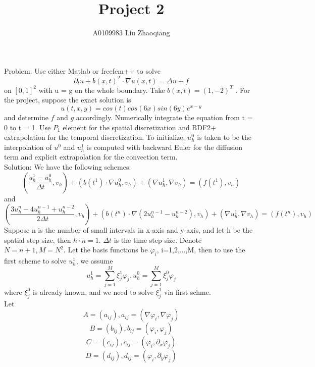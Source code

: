 \documentclass[a4paper,11pt]{article}
\begin{document}
\begin{CJK}{UTF8}{gbsn}
\author{A0109983 Liu Zhaoqiang}                                    
{\large \title{Project 2} }                          
\maketitle    

\noindent Problem:	Use either Matlab or freefem++ to solve
$$\partial _{t}u + b(x,t)^{T}\cdotp \nabla u(x,t)= \Delta u+f $$
on $[0, 1]^{2}$ with u = g on the whole boundary. Take $b(x, t) = (1, -2)^{T}$  . For the project, suppose the exact solution is 
$$u(t, x, y) = cos(t) cos(6x) sin(6y)e^{ x-y}$$
and determine $f$ and $g$ accordingly. Numerically integrate the equation from t = 0 to t = 1.
Use $P_{1}$ element for the spatial discretization and BDF2+ extrapolation for the temporal
discretization. To initialize, $u^{ 0} _{h}$ is taken to be the interpolation of $u ^{0}$ and
$u ^{1}_{ h}$ is computed with backward Euler for the diffusion term and explicit extrapolation for
the convection term.\\
\noindent Solution: We have the following schemes:
\begin{equation}
  (\dfrac{u^{1}_{h}-u^{0}_{h}}{\Delta t},v_{h})+(b(t^{1})\cdotp \nabla u^{0}_{h},v_{h}) + (\nabla u^{1}_{h},\nabla v_{h}) = (f(t^{1}),v_{h})
\end{equation} 
and 
\begin{equation}
  (\dfrac{3u^{n}_{h}-4u^{n-1}_{h}+u^{n-2}_{h}}{2\Delta t},v_{h})+(b(t^{n})\cdotp \nabla (2u^{n-1}_{h}-u^{n-2}_{h}),v_{h}) + (\nabla u^{1}_{h},\nabla v_{h}) = (f(t^{n}),v_{h})
\end{equation} 
Suppose n is the number of small intervals in x-axis and y-axis, and let h be the spatial step size, then $h\cdotp n=1$. $\Delta t$ is the time step size. Denote $N=n+1, M=N^{2}$. Let the basis functions be $\varphi _{i}$, i=1,2,...,M, then to use the first scheme to solve $u^{1}_{h}$, we assume 
$$u^{1}_{h}=\sum _{j=1}^{M} \xi _{j}^{1} \varphi _{j}, u^{0}_{h}=\sum _{j=1}^{M} \xi _{j}^{0} \varphi _{j}$$
where  $\xi _{j}^{0}$ is already known, and we need to solve $\xi _{j}^{1}$ via first schme.\\
Let $$A=(a_{ij}), a_{ij} = (\nabla \varphi _{i}, \nabla \varphi _{j})$$
$$B=(b_{ij}), b_{ij} = (\varphi _{i}, \varphi _{j})$$
$$C=(c_{ij}), c_{ij} = (\varphi _{i}, \partial_{x} \varphi _{j})$$
$$D=(d_{ij}), d_{ij} = (\varphi _{i}, \partial_{y} \varphi _{j})$$
\newpage


\end{CJK}
\end{document}
